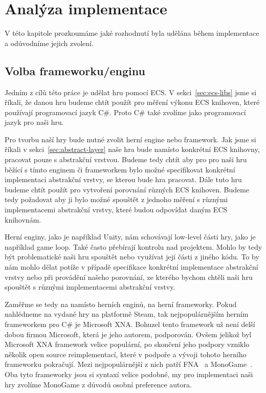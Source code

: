 \chapter{Analýza implementace}
V této kapitole prozkoumáme jaké rozhodnutí byla udělána během implementace a odůvodníme jejich zvolení.


\section{Volba frameworku/enginu}
Jedním z cílů této práce je udělat hru pomocí ECS. V sekci~\ref{sec:ecs-libs} jsme si říkali, že danou hru budeme chtít použít pro měření výkonu ECS knihoven, které používají programovací jazyk C\#. Proto C\# také zvolíme jako programovací jazyk pro naši hru. 

Pro tvorbu naší hry bude nutné zvolit herní engine nebo framework. Jak jsme si říkali v sekci~\ref{sec:abstract-layer} naše hra bude namísto konkrétní ECS knihovny, pracovat pouze s abstrakční vrstvou. Budeme tedy chtít aby pro pro naši hru běžící s tímto enginem či frameworkem bylo možné specifikovat konkrétní implementaci abstrakční vrstvy, se kterou bude hra pracovat. Dále tuto hru budeme chtít použít pro vytvoření porovnání různých ECS knihoven. Budeme tedy požadovat aby ji bylo možné spouštět z jednoho měření s různými implementacemi abstrakční vrstvy, které budou odpovídat daným ECS knihovnám.

Herní enginy, jako je například Unity, nám schovávají low-level části hry, jako je například game loop. Také často přebírají kontrolu nad projektem. Mohlo by tedy být problematické naši hru spouštět nebo využívat její části z jiného kódu. To by nám mohlo dělat potíže v případě specifikace konkrétní implementace abstrakční vrstvy nebo při provádění našeho porovnání, ze kterého bychom chtěli naši hru spouštět s různými implementacemi abstrakční vrstvy.

Zaměřme se tedy na namísto herních enginů, na herní frameworky. Pokud nahlédneme na vydané hry na platformě Steam, tak nejpopulárnějším herním frameworkem pro C\# je Microsoft XNA. Bohuzel tento framework už není delší dobou firmou Microsoft, která je jeho autorem, podporován. Ovšem jelikož byl Microsoft XNA framework velice populární, po skončení jeho podpory vzniklo několik open source reimplementací, které v podpoře a vývoji tohoto herního frameworku pokračují. Mezi nejpopulárnější z nich patří FNA~\cite{FNA} a MonoGame~\cite{MonoGame}. Oba tyto frameworky jsou si syntaxí velice podobné, my pro implementaci naši hry zvolíme MonoGame z důvodů osobní preference autora.

